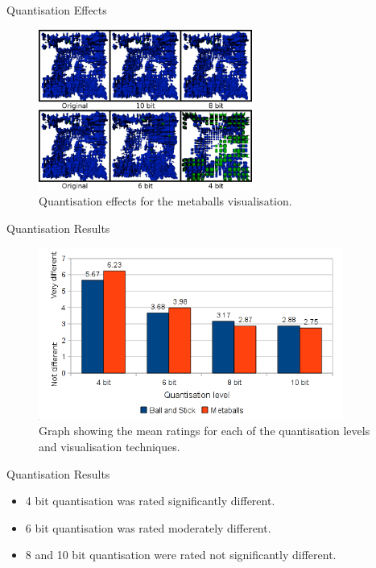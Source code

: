 \documentclass{beamer}
\begin{document}
\begin{frame}{Quantisation Effects}
\begin{figure}
  \centering
  \includegraphics[width=70mm]{min-images/metaballs-4680.png}
  \caption{Quantisation effects for the metaballs visualisation.}
\end{figure}
\end{frame}

\begin{frame}{Quantisation Results}
\begin{figure}
  \centering
  \includegraphics[width=100mm]{min-images/bm-means.png}
  \caption{Graph showing the mean ratings for each of the quantisation levels and visualisation techniques.}
\end{figure}
\end{frame}

\begin{frame}{Quantisation Results}
\begin{itemize}

  \item 4 bit quantisation was rated significantly different.

  \item 6 bit quantisation was rated moderately different.

  \item 8 and 10 bit quantisation were rated not significantly different.

\end{itemize}
\end{frame}
\end{document}
